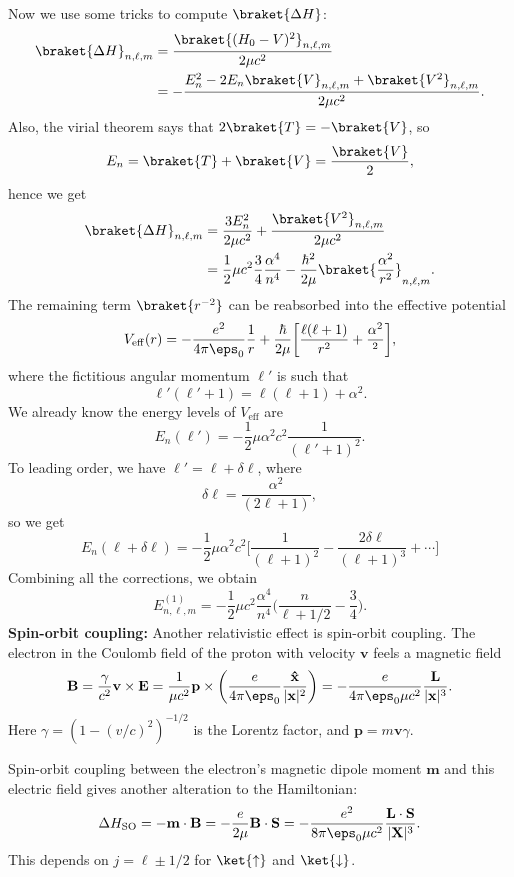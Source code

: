 \documentclass[12pt]{article}
\begin{document}
Now we use some tricks to compute $\braket{\Delta H}$: 
\begin{align*}
	\braket{\Delta H}_{n, \ell, m} &= \frac{\braket{(H_0 - V)^2}_{n, \ell, m}}{2 \mu c^2} \\
				       &= -\frac{E_n^2 - 2 E_n \braket{V}_{n, \ell, m} + \braket{V^2}_{n, \ell, m}}{2 \mu c^2}.
\end{align*}
Also, the virial theorem says that $2 \braket{T} = - \braket{V}$, so
\[
	E_n = \braket{T} + \braket{V} = \frac{\braket{V}}{2},
\]
hence we get
\begin{align*}
	\braket{\Delta H}_{n, \ell, m} &= \frac{3 E_n^2}{2 \mu c^2} + \frac{\braket{V^2}_{n, \ell, m}}{2 \mu c^2} \\
				       &= \frac{1}{2} \mu c^2 \frac{3}{4} \frac{\alpha^{4}}{n^4} - \frac{\hbar^2}{2 \mu} \braket{ \frac{\alpha^2}{r^2} }_{n, \ell, m}.
\end{align*}
The remaining term $\braket{r^{-2}}$ can be reabsorbed into the effective potential
\[
	V_{\mathrm{eff}}(r) = - \frac{e^2}{4 \pi \eps_0} \frac{1}{r} + \frac{\hbar}{2 \mu} \biggl[ \frac{\ell(\ell+1)}{r^2} + \frac{\alpha^2}{^2} \biggr],
\]
where the fictitious angular momentum $\ell'$ is such that
\[
\ell'(\ell'+1) = \ell(\ell+1) + \alpha^2.
\]
We already know the energy levels of $V_{\mathrm{eff}}$ are
\[
E_n(\ell') = -\frac{1}{2} \mu \alpha^2 c^2 \frac{1}{(\ell'+1)^2}.
\]
To leading order, we have $\ell' = \ell + \delta \ell$, where
\[
\delta \ell = \frac{\alpha^2}{(2\ell + 1)},
\]
so we get
\[
	E_n(\ell + \delta \ell) = -\frac{1}{2} \mu \alpha^2 c^2 \biggl[ \frac{1}{(\ell + 1)^2} - \frac{2 \delta \ell }{(\ell + 1)^3} + \cdots \biggr]
\]
Combining all the corrections, we obtain
\[
E_{n, \ell, m}^{(1)} = - \frac{1}{2} \mu c^2 \frac{\alpha^{4}}{n^4} \biggl( \frac{n}{\ell + 1/2} - \frac{3}{4} \biggr).
\]
\textbf{Spin-orbit coupling:} Another relativistic effect is spin-orbit coupling. The electron in the Coulomb field of the proton with velocity $\mathbf{v}$ feels a magnetic field
\[
\mathbf{B} = \frac{\gamma}{c^2} \mathbf{v} \times \mathbf{E} = \frac{1}{\mu c^2} \mathbf{p} \times \biggl( \frac{e}{4 \pi \eps_0} \frac{\mathbf{\hat x}}{|\mathbf{x}|^2} \biggr) = - \frac{e}{4 \pi \eps_0 \mu c^2} \frac{\mathbf{L}}{|\mathbf{x}|^3}.
\]
Here $\gamma = (1 - (v/c)^2)^{-1/2}$ is the Lorentz factor, and $\mathbf{p} = m \mathbf{v} \gamma$.

Spin-orbit coupling between the electron's magnetic dipole moment $\mathbf{m}$ and this electric field gives another alteration to the Hamiltonian:
\[
\Delta H_{\mathrm{SO}} = - \mathbf{m} \cdot \mathbf{B} = - \frac{e}{2 \mu} \mathbf{B} \cdot \mathbf{S} = - \frac{e^2}{8 \pi \eps_0 \mu c^2} \frac{\mathbf{L} \cdot \mathbf{S}}{|\mathbf{X}|^3}.
\]
This depends on $j = \ell \pm 1/2$ for $\ket{\uparrow}$ and $\ket{\downarrow}$.
\end{document}
